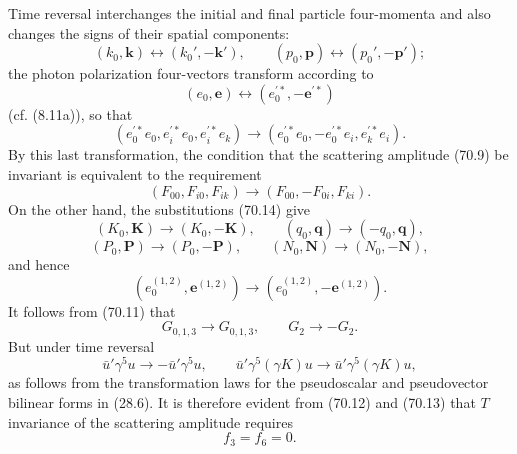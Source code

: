 Time reversal interchanges the initial and final particle four-momenta and also changes the signs of their spatial components:
\begin{equation}
(k_0,\mathbf k)\leftrightarrow(k_0',-\mathbf k'),
\qquad
(p_0,\mathbf p)\leftrightarrow(p_0',-\mathbf p');
\tag{70.14}
\end{equation}
the photon polarization four-vectors transform according to
\begin{equation}
(e_0,\mathbf e)\leftrightarrow(e_0^{\prime *},-\mathbf e^{\prime *})
\tag{70.15}
\end{equation}
(cf. (8.11a)), so that
\[
(e_0^{\prime *}e_0,e_i^{\prime *}e_0,
e_i^{\prime *}e_k)\to
(e_0^{\prime *}e_0,-e_0^{\prime *}e_i,
e_k^{\prime *}e_i).
\]
By this last transformation, the condition that the scattering amplitude (70.9) be invariant is equivalent to the requirement
\[
(F_{00},F_{i0},F_{ik})\to(F_{00},-F_{0i},F_{ki}).
\]
On the other hand, the substitutions (70.14) give
\[
(K_0,\mathbf K)\to(K_0,-\mathbf K),
\qquad(q_0,\mathbf q)\to(-q_0,\mathbf q),
\]
\[
(P_0,\mathbf P)\to(P_0,-\mathbf P),
\qquad(N_0,\mathbf N)\to(N_0,-\mathbf N),
\]
and hence
\begin{equation}
(e_0^{(1,2)},\mathbf e^{(1,2)})
\to(e_0^{(1,2)},-\mathbf e^{(1,2)}).
\tag{70.16}
\end{equation}
It follows from (70.11) that
\[
G_{0,1,3}\to G_{0,1,3},\qquad G_2\to-G_2.
\]
But under time reversal
\[
\bar u'\gamma^5u\to-\bar u'\gamma^5u,
\qquad
\bar u'\gamma^5(\gamma K)u\to
\bar u'\gamma^5(\gamma K)u,
\]
as follows from the transformation laws for the pseudoscalar and pseudovector bilinear forms in (28.6). It is therefore evident from (70.12) and (70.13) that $T$ invariance of the scattering amplitude requires
\begin{equation}
f_3=f_6=0.
\tag{70.17}
\end{equation}
